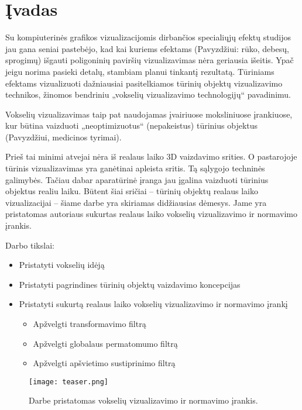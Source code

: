 \section{Įvadas}

Su kompiuterinės grafikos vizualizacijomis dirbančios specialiųjų efektų
studijos jau gana seniai pastebėjo, kad kai kuriems efektams (Pavyzdžiui:
rūko, debesų, sprogimų) išgauti poligoninių paviršių vizualizavimas nėra
geriausia išeitis. Ypač jeigu norima pasieki detalų, stambiam planui tinkantį
rezultatą. Tūriniams efektams vizualizuoti dažniausiai pasitelkiamos tūrinių
objektų vizualizavimo technikos, žinomos bendriniu „vokselių vizualizavimo
technologijų“ pavadinimu.

Vokselių vizualizavimas taip pat naudojamas įvairiuose moksliniuose
įrankiuose, kur būtina vaizduoti „neoptimizuotus“ (nepakeistus) tūrinius
objektus (Pavyzdžiui, medicinos tyrimai).

Prieš tai minimi atvejai nėra iš realaus laiko 3D vaizdavimo srities. O
pastarojoje tūrinis vizualizavimas yra ganėtinai apleista sritis. Tą sąlygojo
techninės galimybės. Tačiau dabar aparatūrinė įranga jau įgalina vaizduoti
tūrinius objektus realiu laiku. Būtent šiai sričiai -- tūrinių objektų realaus
laiko vizualizacijai -- šiame darbe yra skiriamas didžiausias dėmesys. Jame
yra pristatomas autoriaus sukurtas realaus laiko vokselių vizualizavimo ir
normavimo įrankis.

Darbo tikslai:

\begin{itemize}
\item Pristatyti vokselių idėją
\item Pristatyti pagrindines tūrinių objektų vaizdavimo koncepcijas
\item Pristatyti sukurtą realaus laiko vokselių vizualizavimo ir
normavimo įrankį
  \begin{itemize}
  \item Apžvelgti transformavimo filtrą
  \item Apžvelgti globalaus permatomumo filtrą
  \item Apžvelgti apšvietimo sustiprinimo filtrą
  \end{itemize}
\end{itemize}

\begin{figure}[b]
\centering
\texttt{[image: teaser.png]}
\caption{Darbe pristatomas vokselių vizualizavimo ir normavimo įrankis.}
\label{fig:teaser}
\end{figure}

